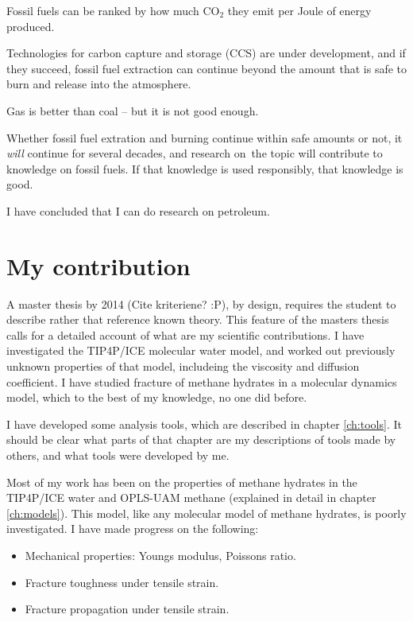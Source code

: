 Fossil fuels can be ranked by how much CO$_2$ they emit per Joule of energy produced.

Technologies for carbon capture and storage (CCS) are under development, and if they succeed, fossil fuel extraction can continue beyond the amount that is safe to burn and release into the atmosphere. 

Gas is better than coal -- but it is not good enough.

Whether fossil fuel extration and burning continue within safe amounts or not, it \emph{will} continue for several decades, and research on the topic will contribute to knowledge on fossil fuels. If that knowledge is used responsibly, that knowledge is good.



I have concluded that I can do research on petroleum. 

\section{My contribution}
A master thesis by 2014 (Cite kriteriene? :P), by design, requires the student to describe rather that reference known theory. This feature of the masters thesis calls for a detailed account of what are my scientific contributions. I have investigated the TIP4P/ICE molecular water model, and worked out previously unknown properties of that model, includeing the viscosity and diffusion coefficient. I have studied fracture of methane hydrates in a molecular dynamics model, which to the best of my knowledge, no one did before. 

I have developed some analysis tools, which are described in chapter \ref{ch:tools}. It should be clear what parts of that chapter are my descriptions of tools made by others, and what tools were developed by me.

Most of my work has been on the properties of methane hydrates in the TIP4P/ICE water and OPLS-UAM methane (explained in detail in chapter \ref{ch:models}). This model, like any molecular model of methane hydrates, is poorly investigated. I have made progress on the following:

\begin{itemize}
\item Mechanical properties: Youngs modulus, Poissons ratio.
\item Fracture toughness under tensile strain.
\item Fracture propagation under tensile strain.
\end{itemize}


